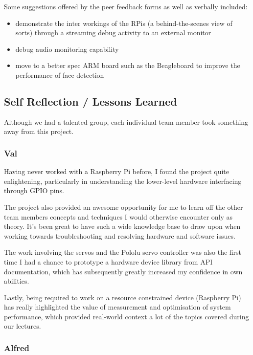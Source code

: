 \documentclass[11pt,a4paper,titlepage]{report}
\begin{document}
Some suggestions offered by the peer feedback forms as well as verbally included:

\begin{itemize}
    \item demonstrate the inter workings of the RPis (a behind-the-scenes view of sorts) through a streaming debug activity to an external monitor
    \item debug audio monitoring capability
    \item move to a better spec ARM board such as the Beagleboard to improve the performance of face detection
\end{itemize}


\subsection{Self Reflection / Lessons Learned}

Although we had a talented group, each individual team member took something away from this project.

\subsubsection{Val}

Having never worked with a Raspberry Pi before, I found the project quite enlightening, particularly in understanding the lower-level hardware interfacing through GPIO pins. 

The project also provided an awesome opportunity for me to learn off the other team members concepts and techniques I would otherwise encounter only as theory. It's been great to have such a wide knowledge base to draw upon when working towards troubleshooting and resolving hardware and software issues.

The work involving the servos and the Pololu servo controller was also the first time I had a chance to prototype a hardware device library from API documentation, which has subsequently greatly increased my confidence in own abilities.

Lastly, being required to work on a resource constrained device (Raspberry Pi) has really highlighted the value of measurement and optimisation of system performance, which provided real-world context a lot of the topics covered during our lectures.

\subsubsection{Alfred}
\end{document}
